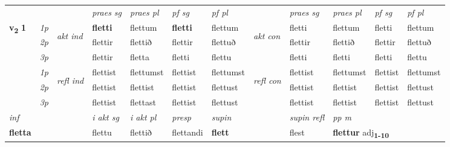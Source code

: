 \begin{longtable}[l]{X>{\footnotesize\itshape}llXXXXlXXXX}
 & &   & \textit{praes sg}  & \textit{praes pl}    & \textit{ pf sg} & \textit{pf pl} & & \textit{praes sg}  & \textit{praes pl}    & \textit{pf sg} & \textit{pf pl }  \\ \cmidrule{4-7} \cmidrule{9-12}
 \multirow{2}{*}{{{\textbf{v{\textsubscript{2}}} \Large{\textbf{1}}}}}  & 1p & \multirow{3}{*}{\begin{turn}{90}\textit{akt ind}\end{turn}} & \textbf{fletti} & flettum & \textbf{fletti} & flettum & \multirow{3}{*}{\begin{turn}{90}\textit{akt con}\end{turn}} &fletti & flettum & fletti & flettum\\*
 & 2p &  &  flettir  & flettið & flettir & flettuð & & flettir & flettið & flettir & flettuð \\*
 & 3p &  & flettir & fletta & fletti & flettu & & fletti & fletti& fletti & flettu \\*
\cmidrule{4-7} \cmidrule{9-12}
 & 1p & \multirow{3}{*}{\begin{turn}{90}\textit{refl ind}\end{turn}}  & flettist & flettumst & flettist & flettumst & \multirow{3}{*}{\begin{turn}{90}\textit{refl con}\end{turn}}  &flettist & flettumst & flettist & flettumst \\*
 & 2p &  & flettist & flettist & flettist & flettust & &flettist & flettist & flettist & flettust \\*
 & 3p  & & flettist & flettast & flettist & flettust & & flettist & flettist& flettist & flettust \\*
\cmidrule{4-7} \cmidrule{9-12}

   {\textit{inf}} & &  & \textit{i akt sg} & \textit{i akt pl}   & \textit{presp} & \textit{supin} && \textit{supin refl} & \textit{pp m} \\*
  {\textbf{fletta}} & && flettu  & flettið   & flettandi &  \textbf{flett} && flest & \multicolumn{2}{l}{\textbf{flettur} adj\textbf{\textsubscript{1-10}}} \\*

\midrule


\end{longtable}
